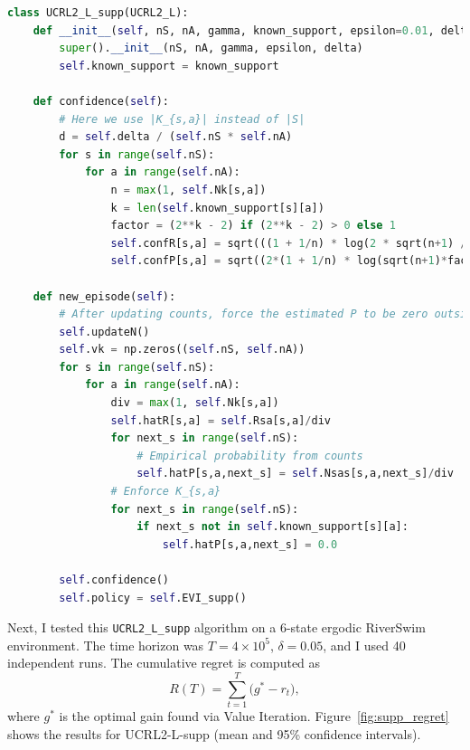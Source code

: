 \begin{lstlisting}[language=Python]
class UCRL2_L_supp(UCRL2_L):
    def __init__(self, nS, nA, gamma, known_support, epsilon=0.01, delta=0.05):
        super().__init__(nS, nA, gamma, epsilon, delta)
        self.known_support = known_support

    def confidence(self):
        # Here we use |K_{s,a}| instead of |S|
        d = self.delta / (self.nS * self.nA)
        for s in range(self.nS):
            for a in range(self.nA):
                n = max(1, self.Nk[s,a])
                k = len(self.known_support[s][a])
                factor = (2**k - 2) if (2**k - 2) > 0 else 1
                self.confR[s,a] = sqrt(((1 + 1/n) * log(2 * sqrt(n+1) / d)) / (2*n))
                self.confP[s,a] = sqrt((2*(1 + 1/n) * log(sqrt(n+1)*factor / d)) / n)

    def new_episode(self):
        # After updating counts, force the estimated P to be zero outside known support
        self.updateN()
        self.vk = np.zeros((self.nS, self.nA))
        for s in range(self.nS):
            for a in range(self.nA):
                div = max(1, self.Nk[s,a])
                self.hatR[s,a] = self.Rsa[s,a]/div
                for next_s in range(self.nS):
                    # Empirical probability from counts
                    self.hatP[s,a,next_s] = self.Nsas[s,a,next_s]/div
                # Enforce K_{s,a}
                for next_s in range(self.nS):
                    if next_s not in self.known_support[s][a]:
                        self.hatP[s,a,next_s] = 0.0
        
        self.confidence()
        self.policy = self.EVI_supp()
\end{lstlisting}

Next, I tested this \texttt{UCRL2\_L\_supp} algorithm on a 6-state ergodic RiverSwim environment. The time horizon was $T = 4 \times 10^5$, $\delta = 0.05$, and I used 40 independent runs. The cumulative regret is computed as
\[
R(T) = \sum_{t=1}^{T} \bigl(g^* - r_t\bigr),
\]
where $g^*$ is the optimal gain found via Value Iteration. Figure~\ref{fig:supp_regret} shows the results for UCRL2-L-supp (mean and 95\% confidence intervals).

